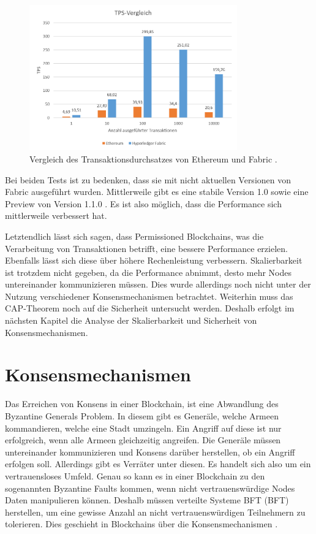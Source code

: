 \begin{figure}[!htbp]
  \centering
    \includegraphics[width=0.8\textwidth,angle=0]{images/TPS-ethvshyp}
     \caption{Vergleich des Transaktionsdurchsatzes von Ethereum und Fabric \cite{PongnumkulPerformanceAnalysisPrivate2017}.}
    \label{fig:tps-ethereum-vs-hyperledger}
\end{figure} 

Bei beiden Tests ist zu bedenken, dass sie mit nicht aktuellen Versionen von Fabric ausgeführt wurden. Mittlerweile gibt es eine stabile Version 1.0 sowie eine Preview von Version 1.1.0 \cite{HyperledgerFabricTeamHyperledgerFabricReleases2018}. Es ist also möglich, dass die Performance sich mittlerweile verbessert hat.

Letztendlich lässt sich sagen, dass Permissioned Blockchains, was die Verarbeitung von Transaktionen betrifft, eine bessere Performance erzielen. Ebenfalls lässt sich diese über höhere Rechenleistung verbessern. Skalierbarkeit ist trotzdem nicht gegeben, da die Performance abnimmt, desto mehr Nodes untereinander kommunizieren müssen. Dies wurde allerdings noch nicht unter der Nutzung verschiedener Konsensmechanismen betrachtet. Weiterhin muss das CAP-Theorem noch auf die Sicherheit untersucht werden. Deshalb erfolgt im nächsten Kapitel die Analyse der Skalierbarkeit und Sicherheit von Konsensmechanismen.

\section{Konsensmechanismen}
\label{sec:eval-konsens}
Das Erreichen von Konsens in einer Blockchain, ist eine Abwandlung des Byzantine Generals Problem. In diesem gibt es Generäle, welche Armeen kommandieren, welche eine Stadt umzingeln. Ein Angriff auf diese ist nur erfolgreich, wenn alle Armeen gleichzeitig angreifen. Die Generäle müssen untereinander kommunizieren und Konsens darüber herstellen, ob ein Angriff erfolgen soll. Allerdings gibt es Verräter unter diesen. Es handelt sich also um ein vertrauensloses Umfeld. Genau so kann es in einer Blockchain zu den sogenannten Byzantine Faults kommen, wenn nicht vertrauenswürdige Nodes Daten manipulieren können. Deshalb müssen verteilte Systeme \acl{BFT} (\acs{BFT}) herstellen, um eine gewisse Anzahl an nicht vertrauenswürdigen Teilnehmern zu tolerieren. Dies geschieht in Blockchains über die Konsensmechanismen \cite{ZhengBlockchainChallengesOpportunities2017}.

